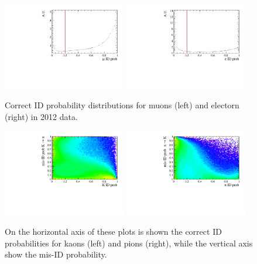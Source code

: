 \begin{figure}[t!]
\label{fig:e_mu_pid}
\centering 
\includegraphics[width=0.48\textwidth]{RKst/figs/muon_PID.pdf}
\includegraphics[width=0.48\textwidth]{RKst/figs/electron_PID.pdf}
\caption{Correct ID probability distributions for muons (left)
and electorn (right) in 2012 data.}
\end{figure}

\begin{figure}[t!]
\label{fig:k_pi_pid}
\centering 
\includegraphics[width=0.48\textwidth]{RKst/figs/kaon_PID.pdf}
\includegraphics[width=0.48\textwidth]{RKst/figs/pion_PID.pdf}
\caption{On the horizontal axis of these plots is shown the correct ID
probabilities for kaons (left) and pions (right), while the vertical
axis show the mis-ID probability.}
\end{figure}

